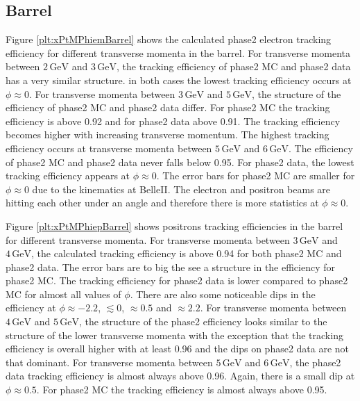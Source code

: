 \documentclass[a4paper,11pt,twosided,final,german,openbib,pdftex,listof=totoc,bibliography=totoc]{scrbook}
\begin{document}
\newpage



\subsection{Barrel}

Figure \ref{plt:xPtMPhiemBarrel} shows the calculated phase2 electron tracking efficiency for different transverse momenta in the barrel. For transverse momenta between $2\,\textrm{GeV}$ and $3\,\textrm{GeV}$, the tracking efficiency of phase2 MC and phase2 data has a very similar structure. in both cases the lowest tracking efficiency occurs at $\phi \approx 0$. For transverse momenta between $3\,\textrm{GeV}$ and $5\,\textrm{GeV}$, the structure of the efficiency of phase2 MC and phase2 data differ. For phase2 MC the tracking efficiency is above 0.92 and for phase2 data above 0.91. The tracking efficiency becomes higher with increasing transverse momentum. The highest tracking efficiency occurs at transverse momenta between $5\,\textrm{GeV}$ and $6\,\textrm{GeV}$. The efficiency of phase2 MC and phase2 data never falls below 0.95. For phase2 data, the lowest tracking efficiency appears at $\phi \approx 0$. The error bars for phase2 MC are smaller for $\phi \approx 0$ due to the kinematics at BelleII. The electron and positron beams are hitting each other under an angle and therefore there is more statistics at $\phi \approx 0$.


Figure \ref{plt:xPtMPhiepBarrel} shows positrons tracking efficiencies in the barrel for different transverse momenta. For transverse momenta between $3\,\textrm{GeV}$ and $4\,\textrm{GeV}$, the calculated tracking efficiency is above 0.94 for both phase2 MC and phase2 data. The error bars are to big the see a structure in the efficiency for phase2 MC. The tracking efficiency for phase2 data is lower compared to phase2 MC for almost all values of $\phi$. There are also some noticeable dips in the efficiency at $\phi \approx -2.2$, $ \lesssim 0$, $ \approx 0.5$ and $ \approx 2.2$. For transverse momenta between $4\,\textrm{GeV}$ and $5\,\textrm{GeV}$, the structure of the phase2 efficiency looks similar to the structure of the lower transverse momenta with the exception that the tracking efficiency is overall higher with at least 0.96 and the dips on phase2 data are not that dominant. For transverse momenta between $5\,\textrm{GeV}$ and $6\,\textrm{GeV}$, the phase2 data tracking efficiency is almost always above 0.96. Again, there is a small dip at $\phi \approx 0.5$. For phase2 MC the tracking efficiency is almost always above 0.95. 
\end{document}
